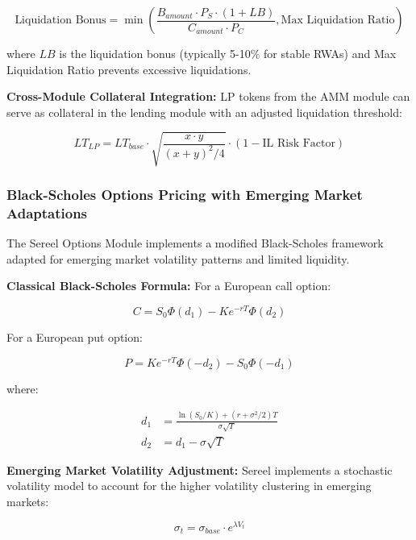 \documentclass[12pt]{article}
\begin{document}
\begin{equation}
\text{Liquidation Bonus} = \min\left(\frac{B_{amount} \cdot P_S \cdot (1 + LB)}{C_{amount} \cdot P_C}, \text{Max Liquidation Ratio}\right)
\end{equation}

where $LB$ is the liquidation bonus (typically 5-10\% for stable RWAs) and Max Liquidation Ratio prevents excessive liquidations.

\textbf{Cross-Module Collateral Integration:}
LP tokens from the AMM module can serve as collateral in the lending module with an adjusted liquidation threshold:

\begin{equation}
LT_{LP} = LT_{base} \cdot \sqrt{\frac{x \cdot y}{(x + y)^2/4}} \cdot (1 - \text{IL Risk Factor})
\end{equation}

\subsubsection{Black-Scholes Options Pricing with Emerging Market Adaptations}

The Sereel Options Module implements a modified Black-Scholes framework \citep{blackscholes1973pricing} adapted for emerging market volatility patterns and limited liquidity.

\textbf{Classical Black-Scholes Formula:}
For a European call option:

\begin{equation}
C = S_0 \Phi(d_1) - K e^{-rT} \Phi(d_2)
\end{equation}

For a European put option:

\begin{equation}
P = K e^{-rT} \Phi(-d_2) - S_0 \Phi(-d_1)
\end{equation}

where:

\begin{align}
d_1 &= \frac{\ln(S_0/K) + (r + \sigma^2/2)T}{\sigma\sqrt{T}} \\
d_2 &= d_1 - \sigma\sqrt{T}
\end{align}

\textbf{Emerging Market Volatility Adjustment:}
Sereel implements a stochastic volatility model to account for the higher volatility clustering in emerging markets:

\begin{equation}
\sigma_t = \sigma_{base} \cdot e^{\lambda V_t}
\end{equation}
\end{document}
